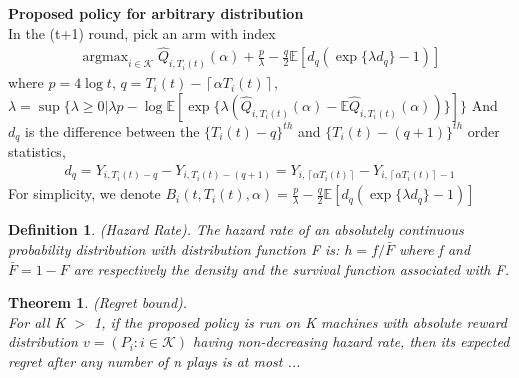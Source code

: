 \documentclass{article}
\DeclareMathOperator*{\argmax}{argmax}
\theoremstyle{plain}
\newtheorem{theo}{Theorem}
\newtheorem{defi}{Definition}
\begin{document}
\textbf{Proposed policy for arbitrary distribution}\\
In the (t+1) round, pick an arm with index
\begin{align}
   \argmax_{i \in \mathcal{K}} \hat{Q}_{i, T_i(t)}(\alpha) + \frac{p}{\lambda} - \frac{q}{2} \mathbb{E}[d_{q} (\exp\{\lambda d_{q}\} - 1)]
\end{align}
where $p = 4 \log t$, $q = T_i(t) - \left\lceil \alpha T_i(t) \right\rceil$, $\lambda = \sup \{ \lambda \geq 0 | \lambda p - \log \mathbb{E}[\exp\{\lambda (\hat{Q}_{i, T_i(t)}(\alpha) - \mathbb{E}\hat{Q}_{i, T_i(t)}(\alpha))\}]\}$ And $d_q$ is the difference between the $\{T_i(t) - q\}^{th}$ and $\{T_i(t) - (q + 1)\}^{th}$ order statistics,
\begin{align}
    d_q = Y_{i,T_i(t) - q} - Y_{i,T_i(t) - (q + 1)} = Y_{i, \left\lceil \alpha T_i(t) \right\rceil} - Y_{i, \left\lceil \alpha T_i(t) \right\rceil - 1}
\end{align}
For simplicity, we denote $B_i(t, T_i(t), \alpha) = \frac{p}{\lambda} - \frac{q}{2} \mathbb{E}[d_{q} (\exp\{\lambda d_{q}\} - 1)]$\\

\begin{defi}
(Hazard Rate)\cite{boucheron2012}. The hazard rate of an absolutely continuous probability
distribution with distribution function F is: $h = f /\bar{F}$ where f and $\bar{F} = 1 - F$ are respectively the density and the survival function associated with F.\\
\end{defi}

\begin{theo}
(Regret bound). \\

For all K $>$ 1, if the proposed policy is run on K machines with absolute reward distribution $v = (P_i: i \in \mathcal{K})$ having non-decreasing hazard rate, then its expected regret after any number of n plays is at most ... \\
\end{theo}
\end{document}
